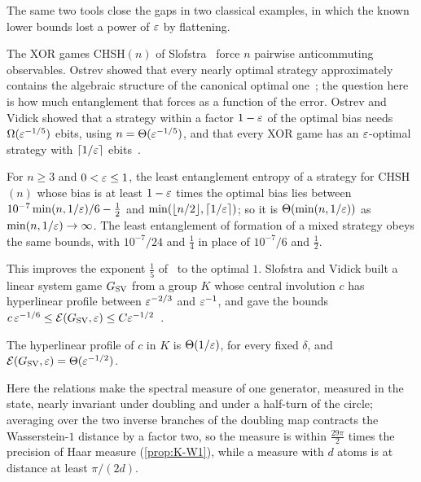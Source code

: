 The same two tools close the gaps in two classical examples, in which the known lower bounds lost a power of $\varepsilon$ by flattening.

The XOR games CHSH$(n)$ of Slofstra~\cite{Slo11} force $n$ pairwise anticommuting observables. Ostrev showed that every nearly optimal
strategy approximately contains the algebraic structure of the canonical optimal one~\cite{Ost16}; the question here is how much
entanglement that forces as a function of the error. Ostrev and Vidick showed that a strategy within
a factor $1-\varepsilon$ of the optimal bias needs $\Omega(\varepsilon^{-1/5})$ ebits, using $n=\Theta(\varepsilon^{-1/5})$, and that every XOR game has an
$\varepsilon$-optimal strategy with $\lceil1/\varepsilon\rceil$ ebits~\cite{OV18}.

\begin{theoremE}
For $n\ge3$ and $0<\varepsilon\le1$, the least entanglement entropy of a strategy for CHSH$(n)$ whose bias is at least $1-\varepsilon$ times the optimal
bias lies between $10^{-7}\min(n,1/\varepsilon)/6-\frac12$ and $\min(\lfloor n/2\rfloor,\lceil1/\varepsilon\rceil)$; so it is $\Theta(\min(n,1/\varepsilon))$ as
$\min(n,1/\varepsilon)\to\infty$. The least entanglement of formation of a mixed strategy obeys the same bounds, with $10^{-7}/24$ and $\frac14$
in place of $10^{-7}/6$ and $\frac12$.
\end{theoremE}

This improves the exponent $\frac15$ of~\cite{OV18} to the optimal $1$. Slofstra and Vidick built a linear system game $G_{\mathrm{SV}}$ from a group $K$
whose central involution $c$ has hyperlinear profile between $\varepsilon^{-2/3}$ and $\varepsilon^{-1}$, and gave the bounds
$c\,\varepsilon^{-1/6}\le\mathcal E(G_{\mathrm{SV}},\varepsilon)\le C\varepsilon^{-1/2}$~\cite{SV18}.

\begin{theoremF}
The hyperlinear profile of $c$ in $K$ is $\Theta(1/\varepsilon)$, for every fixed $\delta$, and $\mathcal E(G_{\mathrm{SV}},\varepsilon)=\Theta(\varepsilon^{-1/2})$.
\end{theoremF}

Here the relations make the spectral measure of one generator, measured in the state, nearly invariant under doubling and under a half-turn
of the circle; averaging over the two inverse branches of the doubling map contracts the Wasserstein-$1$ distance by a factor two, so the
measure is within $\frac{29\pi}2$ times the precision of Haar measure (\cref{prop:K-W1}), while a measure with $d$ atoms is at distance at
least $\pi/(2d)$.

